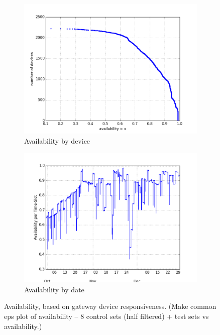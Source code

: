 \begin{figure}[ht!]
\begin{minipage}{1\linewidth}
\centering
%
\begin{subfigure}[b]{0.5\linewidth}
\includegraphics[width=\linewidth]{figures/250-test_dw-availability-CDF.png}
  \caption{Availability by device}
  \label{fig:availability-device}
\end{subfigure}
%
\hspace{-1em}
%
\begin{subfigure}[b]{0.5\linewidth}
\includegraphics[width=\linewidth]{figures/250-test_dw-availability-by-date.png}
  \caption{Availability by date}
  \label{fig:availability-date}
\end{subfigure}
%
\end{minipage}
\caption{Availability, based on gateway device responsiveness. (Make common eps plot of availability -- 8 control sets (half filtered) + test sets vs availability.) }
\label{fig:availability}
\end{figure}




